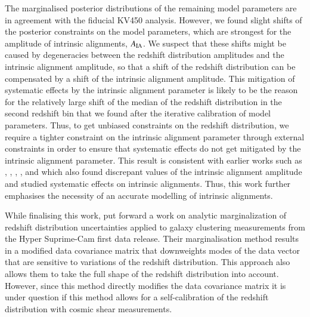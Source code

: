 \documentclass{aa}
\begin{document}
The marginalised posterior distributions of the remaining model parameters are in agreement with the fiducial KV450 analysis. However, we found slight shifts of the posterior constraints on the model parameters, which are strongest for the amplitude of intrinsic alignments, $A_{\rm IA}$. We suspect that these shifts might be caused by degeneracies between the redshift distribution amplitudes and the intrinsic alignment amplitude, so that a shift of the redshift distribution can be compensated by a shift of the intrinsic alignment amplitude. This mitigation of systematic effects by the intrinsic alignment parameter is likely to be the reason for the relatively large shift of the median of the redshift distribution in the second redshift bin that we found after the iterative calibration of model parameters. Thus, to get unbiased constraints on the redshift distribution, we require a tighter constraint on the intrinsic alignment parameter through external constraints in order to ensure that systematic effects do not get mitigated by the intrinsic alignment parameter. This result is consistent with earlier works such as \cite{wright_som_kv450}, \cite{hildebrandt18}, \cite{fortuna20}, \cite{vanUitert18}, and \cite{Efstathiou18} which also found discrepant values of the intrinsic alignment amplitude and studied systematic effects on intrinsic alignments. Thus, this work further emphasises the necessity of an accurate modelling of intrinsic alignments.

While finalising this work, \cite{Hadzhiyska20} put forward a work on analytic marginalization of redshift distribution uncertainties applied to galaxy clustering measurements from the Hyper Suprime-Cam first data release. Their marginalisation method results in a modified data covariance matrix that downweights modes of the data vector that are sensitive to variations of the redshift distribution. This approach also allows them to take the full shape of the redshift distribution into account. However, since this method directly modifies the data covariance matrix it is under question if this method allows for a self-calibration of the redshift distribution with cosmic shear measurements. 
\end{document}
